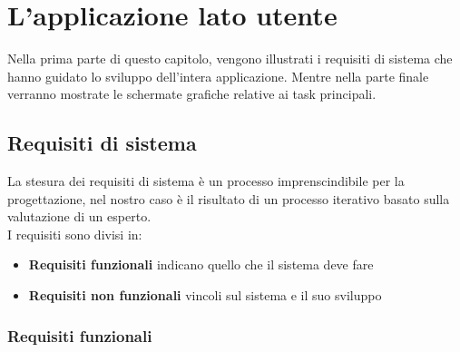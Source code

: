 \chapter{L'applicazione lato utente}
Nella prima parte di questo capitolo, vengono illustrati i requisiti di sistema che hanno guidato lo sviluppo dell'intera applicazione. Mentre nella parte finale verranno mostrate le schermate grafiche relative ai task principali.

\section{Requisiti di sistema}
La stesura dei requisiti di sistema è un processo imprenscindibile per la progettazione, nel nostro caso è il risultato di un processo iterativo basato sulla valutazione di un esperto.\\
I requisiti sono divisi in:
\begin{itemize}
\item \textbf{Requisiti funzionali} indicano quello che il sistema deve fare
\item \textbf{Requisiti non funzionali} vincoli sul sistema e il suo sviluppo
\end{itemize}
 
 \subsection{Requisiti funzionali}

